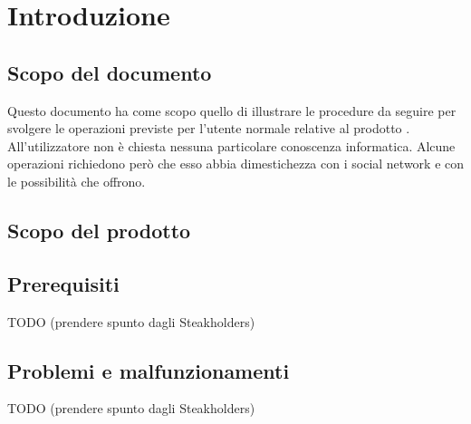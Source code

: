 %


\section{Introduzione} %
\label{sec:introduzione}
	\subsection{Scopo del documento} %
	\label{sub:scopo_del_documento}
	Questo documento ha come scopo quello di illustrare le procedure da seguire per svolgere le operazioni previste per l'utente normale relative al prodotto \projectName. All'utilizzatore non è chiesta nessuna particolare conoscenza informatica. Alcune operazioni richiedono però che esso abbia dimestichezza con i social network e con le possibilità che offrono.

	\subsection{Scopo del prodotto} %
	\label{sub:scopo_del_prodotto}
	\productScope

	\subsection{Prerequisiti} %
	\label{sub:prerequisiti}
	TODO (prendere spunto dagli Steakholders)

	\subsection{Problemi e malfunzionamenti} %
	\label{sub:problemi_e_malfunzionamenti}
	TODO (prendere spunto dagli Steakholders)

